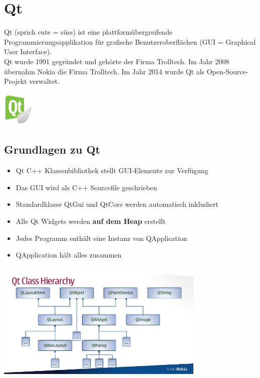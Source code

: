 \section{Qt}
\begin{minipage}{16cm}
	Qt (sprich cute = süss) ist eine plattformübergreifende Programmierungsapplikation für grafische \newline Benutzeroberflächen
    (GUI = Graphical User Interface).\\
	Qt wurde 1991 gegründet und gehörte der Firma Trolltech.
    Im Jahr 2008 übernahm Nokia die Firma Trolltech. Im Jahr 2014 wurde Qt als Open-Source-Projekt verwaltet. 
\end{minipage}
\begin{minipage}{1.5cm}
	\includegraphics[width=1.5cm]{images/qt_logo.jpg}
\end{minipage}

\subsection{Grundlagen zu Qt}
\begin{minipage}{8cm}
	\begin{itemize}
		\item Qt C++ Klassenbibliothek stellt GUI-Elemente zur Verfügung
		\item Das GUI wird als C++ Sourcefile geschrieben
		\item Standardklasse QtGui und QtCore werden \newline automatisch inkludiert
		\item Alle Qt Widgets werden \textbf{auf dem Heap} erstellt
		\item Jedes Programm enthält eine Instanz von QApplication
		\item QApplication hält alles zusammen
	\end{itemize}
\end{minipage}
\begin{minipage}{10cm}
	\includegraphics[width=10cm]{images/qt_classes.jpg}
\end{minipage}

